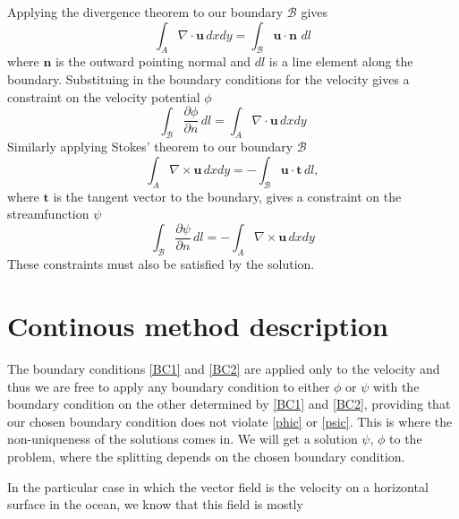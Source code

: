 \documentclass{article}
\begin{document}
\noindent Applying the divergence theorem to our boundary $\mathcal{B}$ gives
\begin{equation} 
\int_A \nabla\cdot\bm{u} \,dx dy = \int_\mathcal{B} \bm{u}\cdot\bm{n}\,\,dl
\end{equation}
where $\bm{n}$ is the outward pointing normal and $dl$ is a line
element along the boundary. Substituing in the boundary conditions for
the velocity gives a constraint on the velocity potential $\phi$
\begin{equation}\label{phic}
\int_{\mathcal{B}} \frac{\partial \phi}{\partial n} \,dl = \int_A
\nabla\cdot\bm{u} \,dx dy
\end{equation}
Similarly applying Stokes' theorem to our boundary $\mathcal{B}$
\begin{equation} 
\int_A \nabla\times\bm{u} \,dx dy = -\int_\mathcal{B} \bm{u}\cdot\bm{t}\,dl,
\end{equation}
where $\bm{t}$ is the tangent vector to the boundary, gives a
constraint on the streamfunction $\psi$
\begin{equation}\label{psic}
\int_{\mathcal{B}} \frac{\partial \psi}{\partial n} \,dl = -\int_A
\nabla\times\bm{u} \,dx dy
\end{equation}
These constraints must also be satisfied by the solution.

\section{Continous method description}

The boundary conditions \eqref{BC1} and \eqref{BC2} are applied only
to the velocity and thus we are free to apply any boundary condition
to either $\phi$ or $\psi$ with the boundary condition on the other
determined by \eqref{BC1} and \eqref{BC2}, providing that our chosen
boundary condition does not violate \eqref{phic} or \eqref{psic}. This
is where the non-uniqueness of the solutions comes in. We will get a
solution $\psi$, $\phi$ to the problem, where the splitting depends on
the chosen boundary condition.

\noindent In the particular case in which the vector field is the velocity on a
horizontal surface in the ocean, we know that this field is mostly
\end{document}
